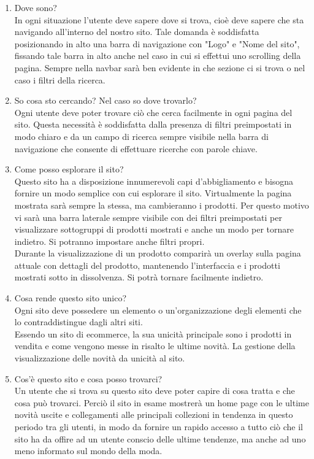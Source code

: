 \documentclass[12pt,a4paper]{report}
\begin{document}
\begin{enumerate}
  \item Dove sono?\\
  In ogni situazione l'utente deve sapere dove si trova, cioè deve sapere che sta navigando all'interno del nostro sito. Tale domanda è soddisfatta posizionando in alto una barra di navigazione con "Logo" e "Nome del sito", fissando tale barra in alto anche nel caso in cui si effettui uno scrolling della pagina. Sempre nella navbar sarà ben evidente in che sezione ci si trova o nel caso i filtri della ricerca.
  \item So cosa sto cercando? Nel caso so dove trovarlo?\\
  Ogni utente deve poter trovare ciò che cerca facilmente in ogni pagina del sito. Questa necessità è soddisfatta dalla presenza di filtri preimpostati in modo chiaro e da un campo di ricerca sempre visibile nella barra di navigazione che consente di effettuare ricerche con parole chiave.
  \item Come posso esplorare il sito?\\
  Questo sito ha a disposizione innumerevoli capi d'abbigliamento e bisogna fornire un modo semplice con cui esplorare il sito. Virtualmente la pagina mostrata sarà sempre la stessa, ma cambieranno i prodotti. Per questo motivo vi sarà una barra laterale sempre visibile con dei filtri preimpostati per visualizzare sottogruppi di prodotti mostrati e anche un modo per tornare indietro. Si potranno impostare anche filtri propri.\\
  Durante la visualizzazione di un prodotto comparirà un overlay sulla pagina attuale con dettagli del prodotto, mantenendo l'interfaccia e i prodotti mostrati sotto in dissolvenza. Si potrà tornare facilmente indietro.
  \item Cosa rende questo sito unico?\\
  Ogni sito deve possedere un elemento o un’organizzazione degli elementi che lo contraddistingue dagli altri siti.\\
  Essendo un sito di ecommerce, la sua unicità principale sono i prodotti in vendita e come vengono messe in risalto le ultime novità. La gestione della visualizzazione delle novità da unicità al sito.
  \item Cos'è questo sito e cosa posso trovarci?\\
  Un utente che si trova su questo sito deve poter capire di cosa tratta e che cosa può trovarci. Perciò il sito in esame mostrerà un home page con le ultime novità uscite e collegamenti alle principali collezioni in tendenza in questo periodo tra gli utenti, in modo da fornire un rapido accesso a tutto ciò che il sito ha da offire ad un utente conscio delle ultime tendenze, ma anche ad uno meno informato sul mondo della moda.

\end{enumerate}
\end{document}
